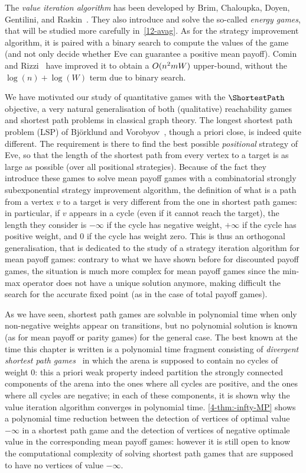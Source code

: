 The \emph{value iteration algorithm} has been developed by Brim,
Chaloupka, Doyen, Gentilini, and
Raskin~\cite{Brim&Chaloupka&Doyen&Gentilini&Raskin:2011}. They also
introduce and solve the so-called \emph{energy games}, that will be
studied more carefully in~\cref{12-avag}. As for the strategy
improvement algorithm, it is paired with a binary search to compute
the values of the game (and not only decide whether Eve can guarantee
a positive mean payoff). Comin and Rizzi~\cite{Comin&Rizzi:2017} have
improved it to obtain a $O(n^2 m W)$ upper-bound, without
the $\log(n)+\log(W)$ term due to binary search.


We have motivated our study of quantitative games with the
$\ShortestPath$ objective, a very natural generalisation of both
(qualitative) reachability games and shortest path problems in
classical graph theory. The longest shortest path problem (LSP) of
Bj\"orklund and Vorobyov~\cite{Bjorklund&Vorobyov:2007}, though a
priori close, is indeed quite different. The requirement is there to
find the best possible \emph{positional} strategy of Eve, so that the
length of the shortest path from every vertex to a target is as large
as possible (over all positional strategies). Because of the fact they
introduce these games to solve mean payoff games with a combinatorial
strongly subexponential strategy improvement algorithm, the definition
of what is a path from a vertex $v$ to a target is very different from
the one in shortest path games: in particular, if $v$ appears in a
cycle (even if it cannot reach the target), the length they consider
is $-\infty$ if the cycle has negative weight, $+\infty$ if the cycle
has positive weight, and $0$ if the cycle has weight zero. This is
thus an orthogonal generalisation, that is dedicated to the study of a
strategy iteration algorithm for mean payoff games: contrary to what
we have shown before for discounted payoff games, the situation is
much more complex for mean payoff games since the min-max operator
does not have a unique solution anymore, making difficult the search
for the accurate fixed point (as in the case of total payoff games).

As we have seen, shortest path games are solvable in polynomial time
when only non-negative weights appear on transitions, but no
polynomial solution is known (as for mean payoff or parity games) for
the general case. The best known at the time this chapter is written
is a polynomial time fragment consisting of \emph{divergent
  shortest path games}~\cite{Busatto&Monmege&Reynier:2017} in which
the arena is supposed to contain no cycles of weight 0: this a priori
weak property indeed partition the strongly connected components of
the arena into the ones where all cycles are positive, and the ones
where all cycles are negative; in each of these components, it is
shown why the value iteration algorithm converges in polynomial
time. \cref{4-thm:-infty-MP} shows a polynomial time reduction between
the detection of vertices of optimal value $-\infty$ in a
shortest path game and the detection of vertices of negative optimale
value in the corresponding mean payoff games: however it is still open
to know the computational complexity of solving shortest path games
that are supposed to have no vertices of value $-\infty$.

